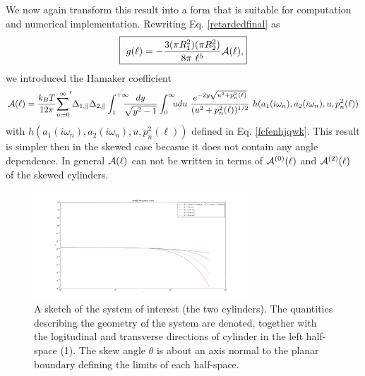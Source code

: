 \documentclass[onecolumn,letterpaper,amsmath,amssymb,floatfix,aps,superscriptaddress]{revtex4}
\begin{document}
We now again transform this result into a form that is suitable for computation and numerical implementation. Rewriting Eq. \ref{retardedfinal} as
\begin{equation}
  \fbox{
    $\displaystyle{
g(\ell) = - \frac{3 (\pi R_1^{2}) (\pi R_2^{2})}{8\pi~\ell^5} {\cal A}(\ell),}$}
\label{retardedfinal-a}
\end{equation}
we introduced the Hamaker coefficient
\begin{equation}
{\cal A}(\ell) = \frac{k_BT}{12 \pi} {\sum_{n=0}^{\infty}}' \Delta_{1,\parallel} \Delta_{2,\parallel} 
\int_{1}^{+\infty}\!\!\!\!\! \frac{dy}{\sqrt{y^2 - 1}} \int_0^{\infty}\!\!\!  u du ~\frac{e^{-2 y \sqrt{u^{2} + p_n^{2}(\ell)}}}{(u^{2} +p_n^{2}(\ell))^{1/2}} ~h(a_1(i \omega_n), a_2(i \omega_n), u, p_n^{2}(\ell))
\label{retardedfinal-b}
\end{equation}
with $h(a_1(i \omega_n), a_2(i \omega_n), u, p_n^{2}(\ell))$ defined in Eq. \ref{fcfenhjqwk}. This result is simpler then in the skewed case becasue it does not contain any angle dependence. In general ${\cal A}(\ell)$ can not be written in terms of ${\cal A}^{(0)}(\ell)$ and ${\cal A}^{(2)}(\ell)$ of the skewed cylinders.

\begin{figure}
    \centerline{\includegraphics[width=8cm]{par_plots/65w65_A_vs_n.pdf}}%
\caption{A sketch of the system of interest (the two cylinders). The quantities describing the geometry of the system are 
denoted, together with the logitudinal and transverse directions of cylinder in the left half-space (1). The skew angle $\theta$ is about an axis normal to the planar boundary defining the limits of each half-space.
}
\label{fig:sketch}
\end{figure}
\end{document}

